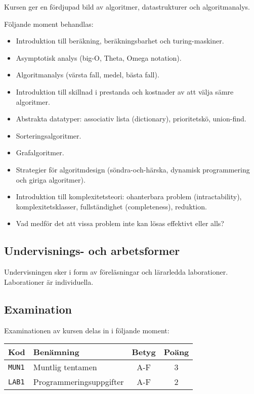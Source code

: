 Kursen ger en fördjupad bild av algoritmer, datastrukturer och
algoritmanalys.

Följande moment behandlas:

\begin{itemize}
\tightlist
\item
  Introduktion till beräkning, beräkningsbarhet och turing-maskiner.
\item
  Asymptotisk analys (big-O, Theta, Omega notation).
\item
  Algoritmanalys (värsta fall, medel, bästa fall).
\item
  Introduktion till skillnad i prestanda och kostnader av att välja
  sämre algoritmer.
\item
  Abstrakta datatyper: associativ lista (dictionary), prioritetskö,
  union-find.
\item
  Sorteringsalgoritmer.
\item
  Grafalgoritmer.
\item
  Strategier för algoritmdesign (söndra-och-härska, dynamisk
  programmering och giriga algoritmer).
\item
  Introduktion till komplexitetsteori: ohanterbara problem
  (intractability), komplexitetsklasser, fullständighet (completeness),
  reduktion.
\item
  Vad medför det att vissa problem inte kan lösas effektivt eller alls?
\end{itemize}

\subsection*{Undervisnings- och
arbetsformer}

Undervisningen sker i form av föreläsningar och lärarledda laborationer.
Laborationer är individuella.

\subsection*{Examination}

Examinationen av kursen delas in i följande moment:

\begin{longtable}[]{@{}llcc@{}}
\toprule
\textsf{Kod} & \textsf{Benämning} & \textsf{Betyg} & \textsf{Poäng}\tabularnewline
\midrule
\endhead
\texttt{MUN1} & Muntlig tentamen & A-F & 3\tabularnewline
\texttt{LAB1} & Programmeringsuppgifter & A-F & 2\tabularnewline
\bottomrule
\end{longtable}

